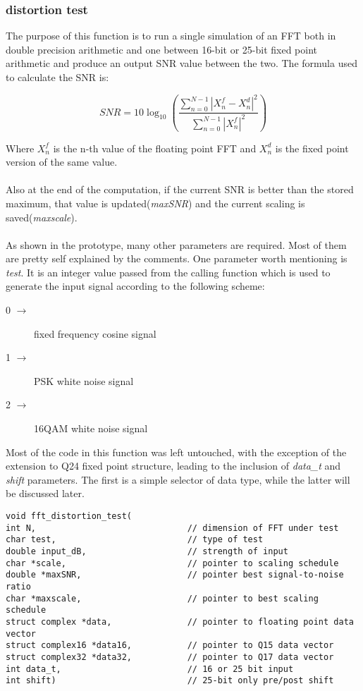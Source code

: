 \documentclass[a4paper]{article}
\begin{document}
\subsubsection{distortion test}
The purpose of this function is to run a single simulation of an FFT both in double precision arithmetic and one between 16-bit or 25-bit fixed point arithmetic and produce an output SNR value between the two.
The formula used to calculate the SNR is:

$$\mathit{SNR} = 10\log_{10}{\left(\frac{\sum_{n=0}^{N-1}{|X_n^f - X_n^d|^2}}{\sum_{n=0}^{N-1}{|X_n^f|^2}}\right)}$$

Where $X_n^f$ is the n-th value of the floating point FFT and $X_n^d$ is the fixed point version of the same value.\\\\
Also at the end of the computation, if the current SNR is better than the stored maximum, that value is updated(\textit{maxSNR}) and the current scaling is saved(\textit{maxscale}).\\\\
As shown in the prototype, many other parameters are required. Most of them are pretty self explained by the comments.
One parameter worth mentioning is \textit{test}. It is an integer value passed from the calling function which is used to generate the input signal according to the following scheme:
\begin{description}
	\item[0 $\rightarrow$] fixed frequency cosine signal
	\item[1 $\rightarrow$] PSK white noise signal
	\item[2 $\rightarrow$] 16QAM white noise signal
\end{description}

Most of the code in this function was left untouched, with the exception of the extension to Q24 fixed point structure, leading to the inclusion of \textit{data\_t} and \textit{shift} parameters.
The first is a simple selector of data type, while the latter will be discussed later.

\begin{lstlisting}
void fft_distortion_test(
int N,                              // dimension of FFT under test 
char test,                          // type of test
double input_dB,                    // strength of input
char *scale,                        // pointer to scaling schedule
double *maxSNR,                     // pointer best signal-to-noise ratio
char *maxscale,                     // pointer to best scaling schedule
struct complex *data,               // pointer to floating point data vector
struct complex16 *data16,           // pointer to Q15 data vector
struct complex32 *data32,           // pointer to Q17 data vector
int data_t,                         // 16 or 25 bit input
int shift)                          // 25-bit only pre/post shift

\end{lstlisting}
\end{document}
